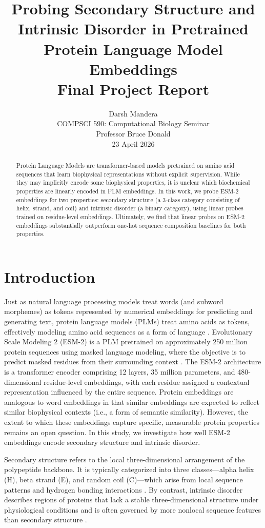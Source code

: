 \documentclass[12pt, letterpaper]{article}
\title{
    \vspace{2cm}
    \Large\textbf{Probing Secondary Structure and Intrinsic Disorder in Pretrained Protein Language Model Embeddings}\\
    \vspace{0.5cm}
    \large Final Project Report\\
}
\author{Darsh Mandera\\
        \small COMPSCI 590: Computational Biology Seminar\\
        \small Professor Bruce Donald \\
        \small 23 April 2026}
\date{}
\begin{document}
\maketitle
\thispagestyle{empty}
\newpage

\tableofcontents
\newpage

\begin{abstract}
Protein Language Models are transformer-based models pretrained on amino acid sequences that learn biophysical representations without explicit supervision. While they may implicitly encode some biophysical properties, it is unclear which biochemical properties are linearly encoded in PLM embeddings. In this work, we probe ESM-2 embeddings for two properties: secondary structure (a 3-class category consisting of helix, strand, and coil) and intrinsic disorder (a binary category), using linear probes trained on residue-level embeddings. Ultimately, we find that linear probes on ESM-2 embeddings substantially outperform one-hot sequence composition baselines for both properties.
\end{abstract}

\section{Introduction}
Just as natural language processing models treat words (and subword morphemes) as tokens represented by numerical embeddings for predicting and generating text, protein language models (PLMs) treat amino acids as tokens, effectively modeling amino acid sequences as a form of language \citet{chandra2023}. Evolutionary Scale Modeling 2 (ESM-2) is a PLM pretrained on approximately 250 million protein sequences using masked language modeling, where the objective is to predict masked residues from their surrounding context \citet{lin2023esm2}. The ESM-2 architecture is a transformer encoder comprising 12 layers, 35 million parameters, and 480-dimensional residue-level embeddings, with each residue assigned a contextual representation influenced by the entire sequence.
Protein embeddings are analogous to word embeddings in that similar embeddings are expected to reflect similar biophysical contexts (i.e., a form of semantic similarity). However, the extent to which these embeddings capture specific, measurable protein properties remains an open question. In this study, we investigate how well ESM-2 embeddings encode secondary structure and intrinsic disorder.

Secondary structure refers to the local three-dimensional arrangement of the polypeptide backbone. It is typically categorized into three classes—alpha helix (H), beta strand (E), and random coil (C)—which arise from local sequence patterns and hydrogen bonding interactions \citet{pauling1951}. By contrast, intrinsic disorder describes regions of proteins that lack a stable three-dimensional structure under physiological conditions and is often governed by more nonlocal sequence features than secondary structure \citet{habchi2014}.
\end{document}
